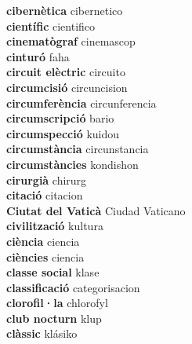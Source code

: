 \textbf{ cibernètica  } cibernetico \\
\textbf{ científic  } cientifico \\
\textbf{ cinematògraf  } cinemascop \\
\textbf{ cinturó  } faha \\
\textbf{ circuit elèctric  } circuito \\
\textbf{ circumcisió  } circuncision \\
\textbf{ circumferència  } circunferencia \\
\textbf{ circumscripció  } bario \\
\textbf{ circumspecció  } kuidou \\
\textbf{ circumstància  } circunstancia \\
\textbf{ circumstàncies  } kondishon \\
\textbf{ cirurgià  } chirurg \\
\textbf{ citació  } citacion \\
\textbf{ Ciutat del Vaticà  } Ciudad Vaticano \\
\textbf{ civilització  } kultura \\
\textbf{ ciència  } ciencia \\
\textbf{ ciències  } ciencia \\
\textbf{ classe social  } klase \\
\textbf{ classificació  } categorisacion \\
\textbf{ clorofil·la  } chlorofyl \\
\textbf{ club nocturn  } klup \\
\textbf{ clàssic  } klásiko \\
